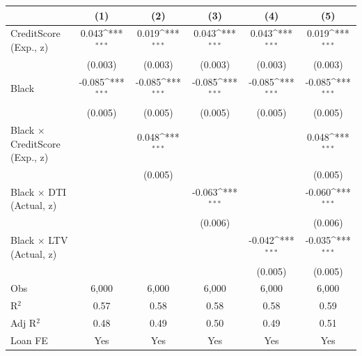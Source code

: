 {
\def\sym#1{\ifmmode^{#1}\else\(^{#1}\)\fi}
\begin{tabular}{l*{5}{c}}
\toprule
                &\multicolumn{1}{c}{(1)}         &\multicolumn{1}{c}{(2)}         &\multicolumn{1}{c}{(3)}         &\multicolumn{1}{c}{(4)}         &\multicolumn{1}{c}{(5)}         \\
\midrule
CreditScore (Exp., z)&    0.043\sym{***}&    0.019\sym{***}&    0.043\sym{***}&    0.043\sym{***}&    0.019\sym{***}\\
                &  (0.003)         &  (0.003)         &  (0.003)         &  (0.003)         &  (0.003)         \\
Black           &   -0.085\sym{***}&   -0.085\sym{***}&   -0.085\sym{***}&   -0.085\sym{***}&   -0.085\sym{***}\\
                &  (0.005)         &  (0.005)         &  (0.005)         &  (0.005)         &  (0.005)         \\
Black $\times$ CreditScore (Exp., z)&                  &    0.048\sym{***}&                  &                  &    0.048\sym{***}\\
                &                  &  (0.005)         &                  &                  &  (0.005)         \\
Black $\times$ DTI (Actual, z)&                  &                  &   -0.063\sym{***}&                  &   -0.060\sym{***}\\
                &                  &                  &  (0.006)         &                  &  (0.006)         \\
Black $\times$ LTV (Actual, z)&                  &                  &                  &   -0.042\sym{***}&   -0.035\sym{***}\\
                &                  &                  &                  &  (0.005)         &  (0.005)         \\
\midrule
Obs             &    6,000         &    6,000         &    6,000         &    6,000         &    6,000         \\
R$^2$           &     0.57         &     0.58         &     0.58         &     0.58         &     0.59         \\
Adj R$^2$       &     0.48         &     0.49         &     0.50         &     0.49         &     0.51         \\
Loan FE         &      Yes         &      Yes         &      Yes         &      Yes         &      Yes         \\
\bottomrule
\end{tabular}
}
